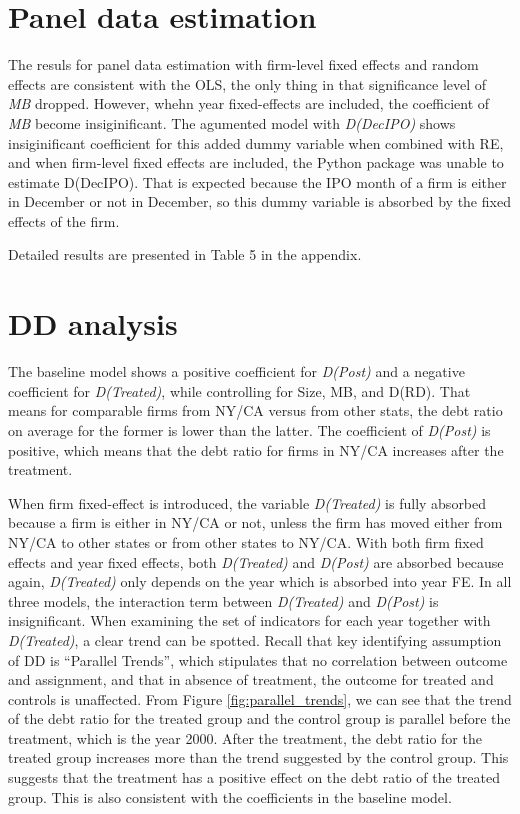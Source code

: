 \documentclass{article}
\begin{document}
\section*{Panel data estimation}
The resuls for panel data estimation with firm-level fixed effects and random effects are consistent with the OLS, the only thing in that
significance level of \textit{MB} dropped. However,
whehn year fixed-effects are included, the coefficient of \textit{MB} become insiginificant.
The agumented model with \textit{D(DecIPO)} shows insiginificant coefficient for this added dummy variable when combined with RE,
and when firm-level fixed effects are included, the Python package was unable to estimate D(DecIPO).
That is expected because the IPO month of a firm is either in December or not in December, so
this dummy variable is absorbed by the fixed effects of the firm.

Detailed results are presented in Table 5 in the appendix.

\section*{DD analysis}
The baseline model shows a positive coefficient for \textit{D(Post)} and a negative coefficient for
\textit{D(Treated)}, while controlling for Size, MB, and D(RD). That means for comparable firms from NY/CA versus from other
stats, the debt ratio on average for the former is lower than the latter. The coefficient of \textit{D(Post)} is
positive, which means that the debt ratio for firms in NY/CA increases after the treatment.

When firm fixed-effect is introduced, the variable \textit{D(Treated)} is fully
absorbed because a firm is either in NY/CA or not, unless the firm has moved either from NY/CA to other states or
from other states to NY/CA. With both firm fixed effects and year fixed effects, both \textit{D(Treated)} and \textit{D(Post)} are absorbed
because again, \textit{D(Treated)} only depends on the year which is absorbed into year FE. In all three models, the interaction
term between \textit{D(Treated)} and \textit{D(Post)} is insignificant.
When examining the set of indicators for each year together with \textit{D(Treated)}, a clear trend can be spotted.
Recall that key identifying assumption of DD is “Parallel Trends”, which stipulates that no correlation between outcome
and assignment, and that in absence of treatment, the outcome for treated and controls is unaffected.
From Figure \ref{fig:parallel_trends}, we can see that the trend of the debt ratio for the treated group and the control group
is parallel before the treatment, which is the year 2000. After the treatment, the debt ratio for the treated group increases more than the trend
suggested by the control group. This suggests that the treatment has a positive effect on the debt ratio of the treated group.
This is also consistent with the coefficients in the baseline model.
\end{document}
